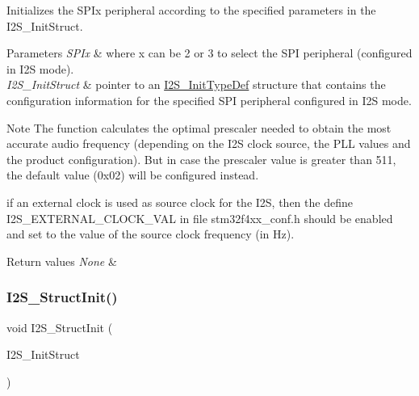 Initializes the S\+P\+Ix peripheral according to the specified parameters in the I2\+S\+\_\+\+Init\+Struct. 


\begin{DoxyParams}{Parameters}
{\em S\+P\+Ix} & where x can be 2 or 3 to select the S\+PI peripheral (configured in I2S mode). \\
\hline
{\em I2\+S\+\_\+\+Init\+Struct} & pointer to an \mbox{\hyperlink{struct_i2_s___init_type_def}{I2\+S\+\_\+\+Init\+Type\+Def}} structure that contains the configuration information for the specified S\+PI peripheral configured in I2S mode.\\
\hline
\end{DoxyParams}
\begin{DoxyNote}{Note}
The function calculates the optimal prescaler needed to obtain the most accurate audio frequency (depending on the I2S clock source, the P\+LL values and the product configuration). But in case the prescaler value is greater than 511, the default value (0x02) will be configured instead. ~\newline
 

if an external clock is used as source clock for the I2S, then the define I2\+S\+\_\+\+E\+X\+T\+E\+R\+N\+A\+L\+\_\+\+C\+L\+O\+C\+K\+\_\+\+V\+AL in file stm32f4xx\+\_\+conf.\+h should be enabled and set to the value of the source clock frequency (in Hz).
\end{DoxyNote}

\begin{DoxyRetVals}{Return values}
{\em None} & \\
\hline
\end{DoxyRetVals}
\mbox{\label{group___s_p_i___group1_ga7470ec1d0759fdeeb42c7fe71a3b41b7}} 
\subsubsection{\texorpdfstring{I2\+S\+\_\+\+Struct\+Init()}{I2S\_StructInit()}}
{\footnotesize\ttfamily void I2\+S\+\_\+\+Struct\+Init (\begin{DoxyParamCaption}\item[{\mbox{\hyperlink{struct_i2_s___init_type_def}{I2\+S\+\_\+\+Init\+Type\+Def}} $\ast$}]{I2\+S\+\_\+\+Init\+Struct }\end{DoxyParamCaption})}



